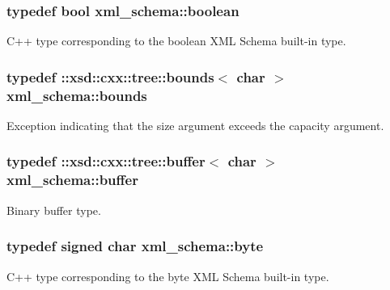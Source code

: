 \subsubsection[{boolean}]{\setlength{\rightskip}{0pt plus 5cm}typedef bool {\bf xml\+\_\+schema\+::boolean}}\label{namespacexml__schema_ae5ada4ec9c54b51765c3e4c0e9631bba}


C++ type corresponding to the boolean X\+M\+L Schema built-\/in type. 

\hypertarget{namespacexml__schema_a00337f2f08dbcb24280f5cf7b96224ea}{}
\subsubsection[{bounds}]{\setlength{\rightskip}{0pt plus 5cm}typedef \+::xsd\+::cxx\+::tree\+::bounds$<$ char $>$ {\bf xml\+\_\+schema\+::bounds}}\label{namespacexml__schema_a00337f2f08dbcb24280f5cf7b96224ea}


Exception indicating that the size argument exceeds the capacity argument. 

\hypertarget{namespacexml__schema_aff62181c1704f35372302e2acde9b0cc}{}
\subsubsection[{buffer}]{\setlength{\rightskip}{0pt plus 5cm}typedef \+::xsd\+::cxx\+::tree\+::buffer$<$ char $>$ {\bf xml\+\_\+schema\+::buffer}}\label{namespacexml__schema_aff62181c1704f35372302e2acde9b0cc}


Binary buffer type. 

\hypertarget{namespacexml__schema_a2a462724b41fb68016d13b34f9a84b7d}{}
\subsubsection[{byte}]{\setlength{\rightskip}{0pt plus 5cm}typedef signed char {\bf xml\+\_\+schema\+::byte}}\label{namespacexml__schema_a2a462724b41fb68016d13b34f9a84b7d}


C++ type corresponding to the byte X\+M\+L Schema built-\/in type. 

\hypertarget{namespacexml__schema_a395f5179c5fc4643909d66e9ff28d8ca}{}
